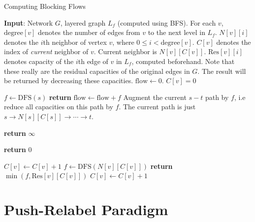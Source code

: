 \documentclass[12pt,a4paper]{amsart}
\numberwithin{equation}{section}
\theoremstyle{definition}
\begin{document}
\begin{algorithm}
	\caption{Computing Blocking Flows}
	\begin{algorithmic}[1]
		\State \textbf{Input}: Network $G$, layered graph $L_f$ (computed using BFS). 
		\State For each $v$, $\text{degree}[v]$ denotes the number of edges from $v$ to the next level in $L_f$.
		\State $N[v][i]$ denotes the $i$th neighbor of vertex $v$, where $0\le i < \text{degree}[v]$. 
		\State $C[v]$ denotes the index of \textit{current} neighbor of $v$. Current neighbor is $N[v][C[v]]$. 
		\State $\text{Res}[v][i]$ denotes  capacity of the $i$th edge of $v$ in $L_f$, computed beforehand. Note that these really are the residual capacities of the original edges in $G$. The result will be returned by decreasing these capacities.  
		\State 
		\State 
		\State $\text{flow} \gets 0$. 
			\State $C[v] = 0$
		\EndFor
		
			\State $f\gets \text{DFS}(s)$
				\State \textbf{return}  
			\Else
				\State $\text{flow} \gets \text{flow} + f$
				\State Augment the current $s-t$ path by $f$, i.e reduce all capacities on this \State path by $f$. The current path is just $s\to N[s][C[s]]\to \cdots \to t$. 
			\EndIf
		\EndWhile
		
			\State{}
			\State{}
			\State{}
			
				\State \textbf{return} $\infty$
			\EndIf
			
					\State \textbf{return} $0$ 
				\EndIf
				
					\State $C[v] \gets C[v] + 1$ 
				\Else
					\State$f\gets \text{DFS}(N[v][C[v]])$
						\State\textbf{return} $\min (f, \text{Res}[v][C[v]])$
					\Else
						\State $C[v]\gets C[v] + 1$
					\EndIf
				\EndIf
			\EndWhile
		\EndFunction
	\end{algorithmic}
\end{algorithm}

\section{Push-Relabel Paradigm} 
\end{document}
